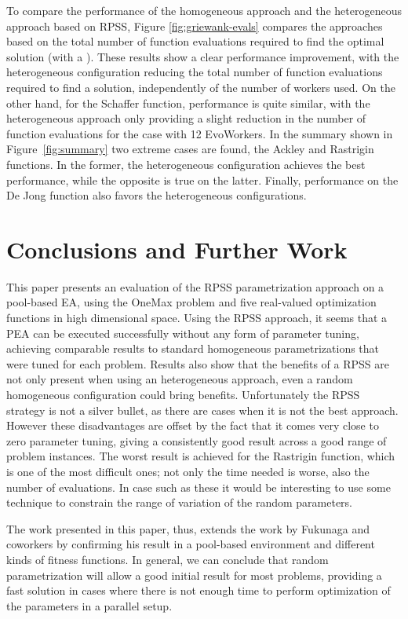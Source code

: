 \documentclass[graybox]{svmult}
\begin{document}
To compare the performance of the homogeneous approach and the heterogeneous approach based on RPSS,
Figure \ref{fig:griewank-evals} compares the approaches based on the total number of function
evaluations required to find the optimal solution (with a ).
These results show a clear performance improvement, with the heterogeneous configuration
reducing the total number of function evaluations required to find a solution,
independently of the number of workers used.
On the other hand, for the Schaffer function, performance is quite similar,
with the heterogeneous approach only providing a slight reduction in the number
of function evaluations for the case with 12 EvoWorkers.
In the summary shown in Figure~\ref{fig:summary} two extreme cases are found, the Ackley and Rastrigin functions.
In the former, the heterogeneous configuration achieves the best performance, while the opposite is true on the latter.
Finally, performance on the De Jong function also favors the heterogeneous configurations.

\section{Conclusions and Further Work}
\label{sec:conclusions}
This paper presents an evaluation of the RPSS parametrization approach on
a pool-based EA, using the OneMax problem and five real-valued optimization functions
in high dimensional space.
Using the RPSS approach, it seems that a PEA can be executed successfully
without any form of parameter tuning, achieving comparable results to standard homogeneous
parametrizations that were tuned for each problem.
Results also show that the benefits of a RPSS are not only present
when using an heterogeneous approach, even a random homogeneous configuration could bring
benefits. Unfortunately the RPSS strategy is not a silver bullet, as there are cases
when it is not the best approach. However these disadvantages are
offset by the fact that it comes very close to zero parameter tuning,
giving a consistently good result across a good range of problem instances.
The worst result is achieved for the Rastrigin function, which
is one of the most difficult ones; not only the time needed is worse,
also the number of evaluations. In case such as these it would be
interesting to use some technique to constrain the range of variation
of the random parameters.

The work presented in this paper, thus, extends the work by Fukunaga
and coworkers by confirming his result in a pool-based environment and
different kinds of fitness functions. In general, we can conclude that
random parametrization will allow a good initial result for most
problems, providing a fast solution in cases where there is not enough
time to perform optimization of the parameters in a parallel setup.
\end{document}
